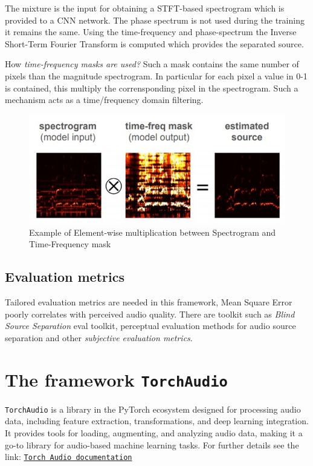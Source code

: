 The mixture is the input for obtaining a STFT-based spectrogram which is provided to a CNN network. The phase spectrum is not used during the training it remains the same. Using the time-frequency and phase-spectrum the Inverse Short-Term Fourier Transform is computed which provides the separated source. 

How \textit{time-frequency masks are used?} Such a mask contains the same number of pixels than the magnitude spectrogram. In particular for each pixel a value in 0-1 is contained, this multiply the corrensponding pixel in the spectrogram. Such a mechanism acts as a time/frequency domain filtering.

\begin{figure}[h]
    \centering
    \includegraphics[scale=0.8]{img/TF_masks.png}
    \caption{Example of Element-wise multiplication between Spectrogram and Time-Frequency mask}
\end{figure}

\subsection{Evaluation metrics}
Tailored evaluation metrics are needed in this framework, Mean Square Error poorly correlates with perceived audio quality. There are toolkit such as \textit{Blind Source Separation} eval toolkit, perceptual evaluation methods for audio source separation and other \textit{subjective evaluation metrics}.

\section{The framework \texttt{TorchAudio}}
\texttt{TorchAudio} is a library in the PyTorch ecosystem designed for processing audio data, including feature extraction, transformations, and deep learning integration. It provides tools for loading, augmenting, and analyzing audio data, making it a go-to library for audio-based machine learning tasks. For further details see the link: \href{https://pytorch.org/audio/stable/index.html}{\texttt{Torch Audio documentation}}